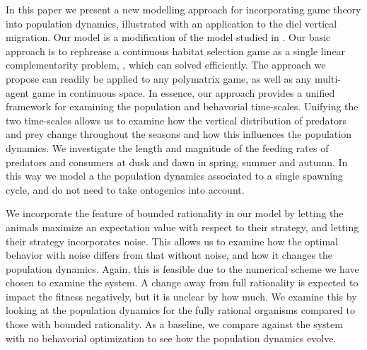 In this paper we present a new modelling  approach for incorporating game theory into population dynamics, illustrated with an application to the diel vertical migration. Our model is a modification of the model studied in \citep{verticalmigration}. Our basic approach is to rephrease a continuous habitat selection game as a single linear complementarity problem, \citep{miller1991copositive}, which can solved efficiently. The approach we propose can readily be applied to any polymatrix game, as well as any multi-agent game in continuous space. In essence, our approach provides a unified framework for examining the population and behavorial time-scales.  Unifying  the two time-scales allows us to examine how the vertical distribution of predators and prey change throughout the seasons and how this influences the population dynamics. We investigate the length and magnitude of the feeding rates of predators and consumers at dusk and dawn in spring, summer and autumn. In this way we model a the population dynamics associated to a single spawning cycle, and do not need to take ontogenics into account. 


We incorporate the feature of bounded rationality in our model by letting the animals maximize an expectation value with respect to their strategy, and letting their strategy incorporates noise. This allows us to examine how the optimal behavior with noise differs from that without noise, and how it changes the population dynamics. Again, this is feasible due to the numerical scheme we have chosen to examine the system. A change away from full rationality is expected to impact the fitness negatively, but it is unclear by how much. We examine this by looking at the population dynamics for the fully rational organisms compared to those with bounded rationality. As a baseline, we compare against the system with no behavorial optimization to see how the population dynamics evolve.





